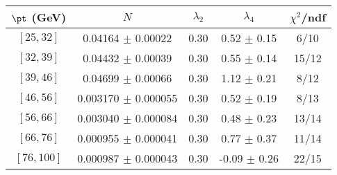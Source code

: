 \begin{tabular}{c||c|c|c|c}
$\pt$ (GeV) & $N$ & $\lambda_{2}$ & $\lambda_4$  & $\chi^2$/ndf  \\
\hline
$[25, 32]$ & 0.04164 $\pm$ 0.00022 & 0.30 & 0.52 $\pm$ 0.15 & 6/10\\
$[32, 39]$ & 0.04432 $\pm$ 0.00039 & 0.30 & 0.55 $\pm$ 0.14 & 15/12\\
$[39, 46]$ & 0.04699 $\pm$ 0.00066 & 0.30 & 1.12 $\pm$ 0.21 & 8/12\\
$[46, 56]$ & 0.003170 $\pm$ 0.000055 & 0.30 & 0.52 $\pm$ 0.19 & 8/13\\
$[56, 66]$ & 0.003040 $\pm$ 0.000084 & 0.30 & 0.48 $\pm$ 0.23 & 13/14\\
$[66, 76]$ & 0.000955 $\pm$ 0.000041 & 0.30 & 0.77 $\pm$ 0.37 & 11/14\\
$[76, 100]$ & 0.000987 $\pm$ 0.000043 & 0.30 & -0.09 $\pm$ 0.26 & 22/15\\
\end{tabular}
